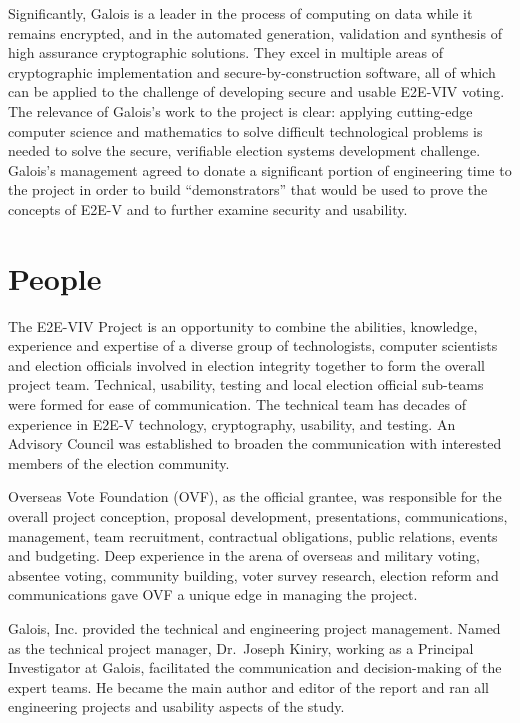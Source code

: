 Significantly, Galois is a leader in the process of computing on data
while it remains encrypted, and in the automated generation,
validation and synthesis of high assurance cryptographic solutions.
They excel in multiple areas of cryptographic implementation and
secure-by-construction software, all of which can be applied to the
challenge of developing secure and usable E2E-VIV voting. The
relevance of Galois’s work to the project is clear: applying
cutting-edge computer science and mathematics to solve difficult
technological problems is needed to solve the secure, verifiable
election systems development challenge. Galois’s management agreed to
donate a significant portion of engineering time to the project in
order to build “demonstrators” that would be used to prove the
concepts of E2E-V and to further examine security and usability.

\section{People}
\label{sec:people}

The E2E-VIV Project is an opportunity to combine the abilities,
knowledge, experience and expertise of a diverse group of
technologists, computer scientists and election officials involved in
election integrity together to form the overall project
team. Technical, usability, testing and local election official
sub-teams were formed for ease of communication. The technical team
has decades of experience in E2E-V technology, cryptography, usability,
and testing. An Advisory Council was established to broaden the
communication with interested members of the election community.

Overseas Vote Foundation (OVF), as the official grantee, was
responsible for the overall project conception, proposal development,
presentations, communications, management, team recruitment,
contractual obligations, public relations, events and budgeting. Deep
experience in the arena of overseas and military voting, absentee
voting, community building, voter survey research, election reform and
communications gave OVF a unique edge in managing the project.

Galois, Inc. provided the technical and engineering project
management. Named as the technical project manager, Dr.~Joseph Kiniry,
working as a Principal Investigator at Galois, facilitated the
communication and decision-making of the expert teams. He became the
main author and editor of the report and ran all engineering projects
and usability aspects of the study.

